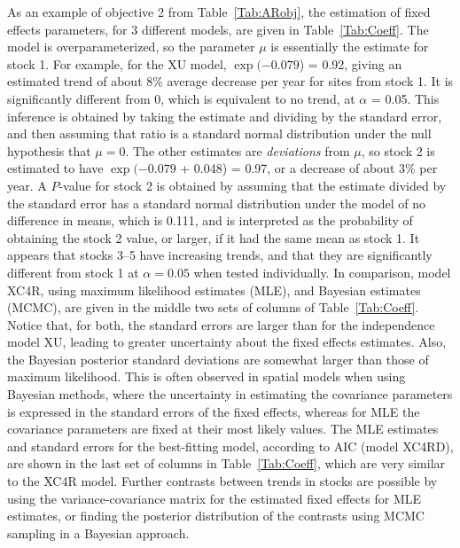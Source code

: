 \documentclass[11pt, titlepage]{article}\usepackage[]{graphicx}\usepackage[]{color}
\begin{document}
\begin{spacing}{1.9}
\begin{flushleft}
As an example of objective 2 from Table~\ref{Tab:ARobj}, the estimation of fixed effects parameters, for 3 different models, are given in Table~\ref{Tab:Coeff}.  The model is overparameterized, so the parameter $\mu$ is essentially the estimate for stock 1. For example, for the XU model, $\exp($\ensuremath{-0.079}) = 0.92, giving an estimated trend of about 8\% average decrease per year for sites from stock 1. It is significantly different from 0, which is equivalent to no trend, at $\alpha$ = 0.05. This inference is obtained by taking the estimate and dividing by the standard error, and then assuming that ratio is a standard normal distribution under the null hypothesis that $\mu = 0$. The other estimates are \emph{deviations} from $\mu$, so stock 2 is estimated to have $\exp($\ensuremath{-0.079} + 0.048) = 0.97, or a decrease of about 3\% per year.  A $P$-value for stock 2 is obtained by assuming that the estimate divided by the standard error has a standard normal distribution under the model of no difference in means, which is 0.111, and is interpreted as the probability of obtaining the stock 2 value, or larger, if it had the same mean as stock 1.  It appears that stocks 3--5 have increasing trends, and that they are significantly different from stock 1 at $\alpha = 0.05$ when tested individually.  In comparison, model XC4R, using maximum likelihood estimates (MLE), and Bayesian estimates (MCMC), are given in the middle two sets of columns of Table~\ref{Tab:Coeff}.  Notice that, for both, the standard errors are larger than for the independence model XU, leading to greater uncertainty about the fixed effects estimates.  Also, the Bayesian posterior standard deviations are somewhat larger than those of maximum likelihood.  This is often observed in spatial models when using Bayesian methods, where the uncertainty in estimating the covariance parameters is expressed in the standard errors of the fixed effects, whereas for MLE the covariance parameters are fixed at their most likely values.  The MLE estimates and standard errors for the best-fitting model, according to AIC (model XC4RD), are shown in the last set of columns in Table~\ref{Tab:Coeff}, which are very similar to the XC4R model.  Further contrasts between trends in stocks are possible by using the variance-covariance matrix for the estimated fixed effects for MLE estimates, or finding the posterior distribution of the contrasts using MCMC sampling in a Bayesian approach.


\end{flushleft}
\end{spacing}
\end{document}
